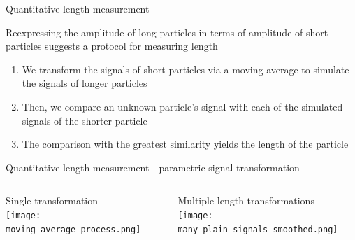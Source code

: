 \begin{frame}[c]{Quantitative length measurement}
	

	{\footnotesize
		Reexpressing the amplitude of long particles in terms of amplitude of short particles suggests a protocol for measuring length \\
		\begin{enumerate}
			\item We transform the signals of short particles via a moving average to simulate the signals of longer particles \\
			\item Then, we compare an unknown particle's signal with each of the simulated signals of the shorter particle \\
			\item The comparison with the greatest similarity yields the length of the particle
		\end{enumerate}
	}

\end{frame}




\begin{frame}[c]{Quantitative length measurement---parametric signal transformation}
	\begin{columns}[t]
	
		\begin{column}[T]{2.25in}
			{\centering
				Single transformation \\
				\texttt{[image: moving\_average\_process.png]} \\
				\par
			}
		\end{column}
		\hfill
		\begin{column}[T]{2.25in}
			{\centering
				Multiple length transformations \\
				\texttt{[image: many\_plain\_signals\_smoothed.png]} \\
				\par
			}
		\end{column}

	\end{columns}
	


\end{frame}



